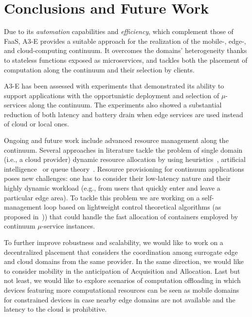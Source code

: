 \section{Conclusions and Future Work}\label{sec:conclusions}

Due to its \textit{automation} capabilities and \textit{efficiency}, which complement those of FaaS, A3-E provides a suitable approach for the realization of the mobile-, edge-, and cloud-computing continuum. It overcomes the domains' heterogeneity thanks to stateless functions exposed as microservices, and tackles both the placement of computation along the continuum and their selection by clients.

A3-E has been assessed with experiments that demonstrated its ability to support applications with the opportunistic deployment and selection of $\mu$-services along the continuum.
The experiments also showed a substantial reduction of both latency and battery drain when edge services are used instead of cloud or local ones. 

Ongoing and future work include advanced resource management along the continuum. Several approaches in literature tackle the problem of single domain (i.e., a cloud provider) dynamic resource allocation by using heuristics~\cite{dustdar0}, artificial intelligence~\cite{ia1} or queue theory~\cite{queue1}. 
Resource provisioning for continuum applications poses new challenges: one has to consider their low-latency nature and their highly dynamic workload (e.g., from users that quickly enter and leave a particular edge area). To tackle this problem we are working on a self-management loop based on lightweight control theoretical algorithms (as proposed in~\cite{Quatrocchi2016discrete})) that could handle the fast allocation of containers employed by continuum $\mu$-service instances. %


To further improve robustness and scalability, we would like to work on a decentralized placement that considers the coordination among surrogate edge and cloud domains from the same provider. In the same direction, we would like to consider mobility in the anticipation of Acquisition and Allocation. Last but not least, 
we would like to explore scenarios of computation offloading in which devices featuring more computational resources can be seen as mobile domains for constrained devices in case nearby edge domains are not available and the latency to the cloud is prohibitive.